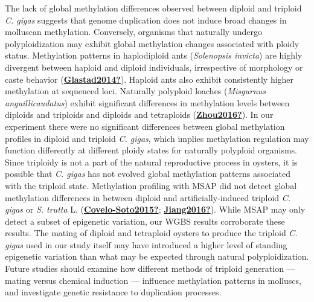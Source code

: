 \documentclass [11pt, proquest] {uwthesis}[2015/03/03]
\begin{document}
The lack of global methylation differences observed between diploid and triploid \emph{C. gigas} suggests that genome duplication does not induce broad changes in molluscan methylation. Conversely, organisms that naturally undergo polyploidization may exhibit global methylation changes associated with ploidy status. Methylation patterns in haplodiploid ants (\emph{Solenopsis invicta}) are highly divergent between haploid and diploid individuals, irrespective of morphology or caste behavior (\protect\hyperlink{ref-Glastad2014}{\textbf{Glastad2014?}}). Haploid ants also exhibit consistently higher methylation at sequenced loci. Naturally polyploid loaches (\emph{Misgurnus anguillicaudatus}) exhibit significant differences in methylation levels between diploids and triploids and diploids and tetraploids (\protect\hyperlink{ref-Zhou2016}{\textbf{Zhou2016?}}). In our experiment there were no significant differences between global methylation profiles in diploid and triploid \emph{C. gigas}, which implies methylation regulation may function differently at different ploidy states for naturally polyploid organisms. Since triploidy is not a part of the natural reproductive process in oysters, it is possible that \emph{C. gigas} has not evolved global methylation patterns associated with the triploid state. Methylation profiling with MSAP did not detect global methylation differences in between diploid and artificially-induced triploid \emph{C. gigas} or \emph{S. trutta} L. (\protect\hyperlink{ref-Covelo-Soto2015}{\textbf{Covelo-Soto2015?}}; \protect\hyperlink{ref-Jiang2016}{\textbf{Jiang2016?}}). While MSAP may only detect a subset of epigenetic variation, our WGBS results corroborate these results. The mating of diploid and tetraploid oysters to produce the triploid \emph{C. gigas} used in our study itself may have introduced a higher level of standing epigenetic variation than what may be expected through natural polyploidization. Future studies should examine how different methods of triploid generation --- mating versus chemical induction --- influence methylation patterns in molluscs, and investigate genetic resistance to duplication processes.
\end{document}
